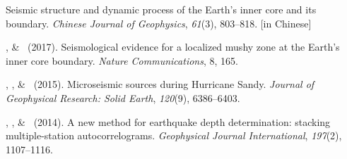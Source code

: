\begin{etaremune}
    Seismic structure and dynamic process of the Earth's inner core and its boundary.
    \emph{Chinese Journal of Geophysics}, \emph{61}(3), 803--818.
     [in Chinese]
\item
    \Me, \& \LWen\CS\ (2017).
    Seismological evidence for a localized mushy zone at the Earth's inner core boundary.
    \emph{Nature Communications}, 8, 165.
\item
    \XChen\CS, \Me, \& \LWen\ (2015).
    Microseismic sources during Hurricane Sandy.
    \emph{Journal of Geophysical Research: Solid Earth}, \emph{120}(9), 6386--6403.
\item \MZhang\CS, \Me, \& \LWen\ (2014).
    A new method for earthquake depth determination: stacking multiple-station autocorrelograms.
    \emph{Geophysical Journal International}, \emph{197}(2), 1107--1116.
\end{etaremune}

